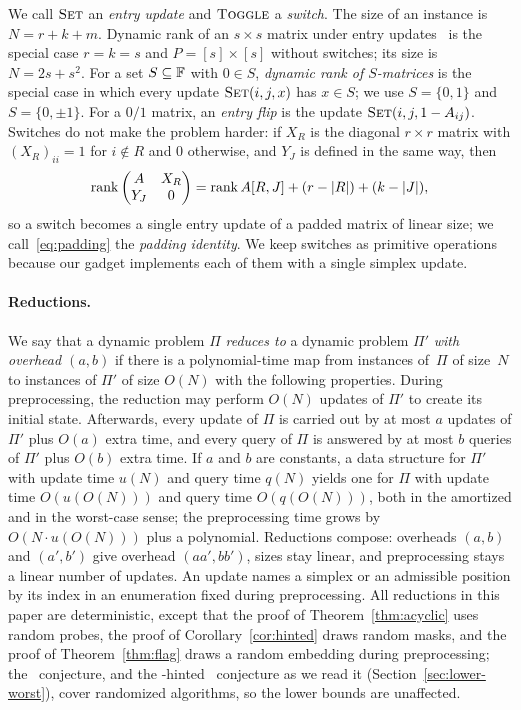 We call $\textsc{Set}$ an \emph{entry update} and $\textsc{Toggle}$ a \emph{switch}.
The size of an instance is $N=r+k+m$.
Dynamic rank of an $s\times s$ matrix under entry updates~\cite{FF09,San07,vdBNS19} is the special case $r=k=s$ and $P=[s]\times[s]$ without switches; its size is $N=2s+s^2$.
For a set $S\subseteq\mathbb{F}$ with $0\in S$, \emph{dynamic rank of $S$-matrices} is the special case in which every update $\textsc{Set}(i,j,x)$ has $x\in S$; we use $S=\{0,1\}$ and $S=\{0,\pm1\}$.
For a $0/1$ matrix, an \emph{entry flip} is the update $\textsc{Set}(i,j,1-A_{ij})$.
Switches do not make the problem harder: if $X_R$ is the diagonal $r\times r$ matrix with $(X_R)_{ii}=1$ for $i\notin R$ and $0$ otherwise, and $Y_J$ is defined in the same way, then
\begin{equation}\label{eq:padding}
  \operatorname{rank}\begin{pmatrix}A&X_R\\Y_J&0\end{pmatrix}=\operatorname{rank} A[R,J]+(r-|R|)+(k-|J|),
\end{equation}
so a switch becomes a single entry update of a padded matrix of linear size; we call~\eqref{eq:padding} the \emph{padding identity}.
We keep switches as primitive operations because our gadget implements each of them with a single simplex update.

\paragraph{Reductions.}
We say that a dynamic problem $\Pi$ \emph{reduces to} a dynamic problem $\Pi'$ \emph{with overhead $(a,b)$} if there is a polynomial-time map from instances of~$\Pi$ of size~$N$ to instances of $\Pi'$ of size $O(N)$ with the following properties.
During preprocessing, the reduction may perform $O(N)$ updates of $\Pi'$ to create its initial state.
Afterwards, every update of $\Pi$ is carried out by at most $a$ updates of $\Pi'$ plus $O(a)$ extra time, and every query of $\Pi$ is answered by at most $b$ queries of $\Pi'$ plus $O(b)$ extra time.
If $a$ and $b$ are constants, a data structure for $\Pi'$ with update time $u(N)$ and query time $q(N)$ yields one for $\Pi$ with update time $O(u(O(N)))$ and query time $O(q(O(N)))$, both in the amortized and in the worst-case sense; the preprocessing time grows by $O(N\cdot u(O(N)))$ plus a polynomial.
Reductions compose: overheads $(a,b)$ and $(a',b')$ give overhead $(aa',bb')$, sizes stay linear, and preprocessing stays a linear number of updates.
An update names a simplex or an admissible position by its index in an enumeration fixed during preprocessing.
All reductions in this paper are deterministic, except that the proof of Theorem~\ref{thm:acyclic} uses random probes, the proof of Corollary~\ref{cor:hinted} draws random masks, and the proof of Theorem~\ref{thm:flag} draws a random embedding during preprocessing; the \OMv\ conjecture, and the \uMv-hinted \uMv\ conjecture as we read it (Section~\ref{sec:lower-worst}), cover randomized algorithms, so the lower bounds are unaffected.

